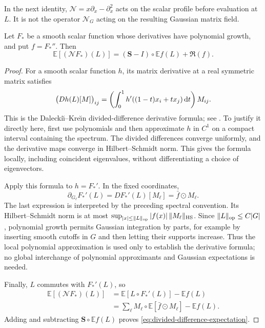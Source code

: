 In the next identity, $\mathcal{N}=x\partial_x-\partial_x^2$ acts on the scalar profile before evaluation at $L$. It is not the operator $\mathcal{N}_G$ acting on the resulting Gaussian matrix field.

\begin{lemma}\label{lem:linear-spectral-identity}
Let $F_*$ be a smooth scalar function whose derivatives have polynomial growth, and put $f=F_*''$.  Then
\begin{equation}
 \mathbb{E}[(\mathcal{N} F_*)(L)]
       =(\mathbf{S}-I)\circ\mathbb{E} f(L)+\mathfrak{R}(f).
 \label{eq:divided-difference-expectation}
\end{equation}
\end{lemma}

\begin{proof}
For a smooth scalar function $h$, its matrix derivative at a real symmetric matrix satisfies
\[
 \bigl(Dh(L)[M]\bigr)_{ij}
   =\left(\int_0^1 h'((1-t)x_i+tx_j)\,\mathrm{d} t\right)M_{ij}.
\]
This is the Dalecki\u{\i}--Kre\u{\i}n divided-difference derivative formula; see \cite[Theorem~2.11]{Noferini2017}.  To justify it directly here, first use polynomials and then approximate $h$ in $C^1$ on a compact interval containing the spectrum.  The divided differences converge uniformly, and the derivative maps converge in Hilbert--Schmidt norm.  This gives the formula locally, including coincident eigenvalues, without differentiating a choice of eigenvectors.

Apply this formula to $h=F_*'$.  In the fixed coordinates,
\[
 \partial_{G_\ell}F_*'(L)=DF_*'(L)[M_\ell]
                         =\bar f\odot M_\ell.
\]
The last expression is interpreted by the preceding spectral convention. Its Hilbert--Schmidt norm is at most $\sup_{|x|\le\|L\|_{\rm op}}|f(x)|\,\|M_\ell\|_{\rm HS}$. Since $\|L\|_{\rm op}\le C|G|$, polynomial growth permits Gaussian integration by parts, for example by inserting smooth cutoffs in $G$ and then letting their supports increase.  Thus the local polynomial approximation is used only to establish the derivative formula; no global interchange of polynomial approximants and Gaussian expectations is needed.

Finally, $L$ commutes with $F_*'(L)$, so
\[
 \begin{aligned}
 \mathbb{E}[(\mathcal{N} F_*)(L)]
 &=\mathbb{E}[L\circ F_*'(L)]-\mathbb{E} f(L)\\
 &=\sum_\ell M_\ell\circ
           \mathbb{E}[\bar f\odot M_\ell]-\mathbb{E} f(L).
 \end{aligned}
\]
Adding and subtracting $\mathbf{S}\circ\mathbb{E} f(L)$ proves \eqref{eq:divided-difference-expectation}.
\end{proof}

